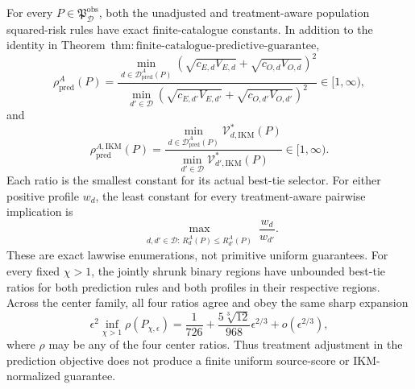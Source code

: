 For every \(P\in\mathfrak P_{\mathcal D}^{\mathrm{obs}}\), both the unadjusted and treatment-aware population squared-risk rules have exact finite-catalogue constants. In addition to the identity in Theorem~\(\mathrm{thm{:}finite\text{-}catalogue\text{-}predictive\text{-}guarantee}\),
\[
 \rho_{\mathrm{pred}}^A(P)=
 \frac{\min_{d\in\mathcal D_{\mathrm{pred}}^A(P)}
 (\sqrt{c_{E,d}V_{E,d}}+\sqrt{c_{O,d}V_{O,d}})^2}
 {\min_{d'\in\mathcal D}
 (\sqrt{c_{E,d'}V_{E,d'}}+\sqrt{c_{O,d'}V_{O,d'}})^2}\in[1,\infty), \tag{1}
\]
and
\[
 \rho_{\mathrm{pred}}^{A,\mathrm{IKM}}(P)=
 \frac{\min_{d\in\mathcal D_{\mathrm{pred}}^A(P)}
 \mathcal V_{d,\mathrm{IKM}}^*(P)}
 {\min_{d'\in\mathcal D}\mathcal V_{d',\mathrm{IKM}}^*(P)}\in[1,\infty). \tag{2}
\]
Each ratio is the smallest constant for its actual best-tie selector. For either positive profile \(w_d\), the least constant for every treatment-aware pairwise implication is
\[
 \max_{\substack{d,d'\in\mathcal D:\,R_d^A(P)\le R_{d'}^A(P)}}\frac{w_d}{w_{d'}}. \tag{3}
\]
These are exact lawwise enumerations, not primitive uniform guarantees. For every fixed \(\chi>1\), the jointly shrunk binary regions have unbounded best-tie ratios for both prediction rules and both profiles in their respective regions. Across the center family, all four ratios agree and obey the same sharp expansion
\[
 \epsilon^2\inf_{\chi>1}\rho(P_{\chi,\epsilon})
 =\frac1{726}+\frac{5\sqrt[3]{12}}{968}\epsilon^{2/3}+o(\epsilon^{2/3}), \tag{4}
\]
where \(\rho\) may be any of the four center ratios. Thus treatment adjustment in the prediction objective does not produce a finite uniform source-score or IKM-normalized guarantee.